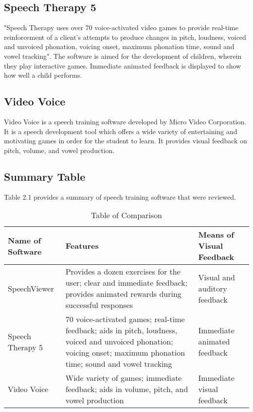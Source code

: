\subsection{Speech Therapy 5}
"Speech Therapy uses over 70 voice-activated video games to provide real-time reinforcement of a client's attempts to produce changes in pitch, loudness, voiced and unvoiced phonation, voicing onset, maximum phonation time, sound and vowel tracking"\cite{drspeech:1998:st5}. The software is aimed for the development of children, wherein they play interactive games. Immediate animated feedback is displayed to show how well a child performs.

\subsection{Video Voice}
Video Voice is a speech training software developed by Micro Video Corporation. It is a speech development tool which offers a wide variety of entertaining and motivating games in order for the student to learn. It provides visual feedback on pitch, volume, and vowel production.

\pagebreak
\subsection{Summary Table}
Table 2.1 provides a summary of speech training software that were reviewed.
\begin{table}[ht]   %
\centering
\caption{Table of Comparison} \vspace{0.25em}
\begin{tabular}{|p{1.5in}|p{2in}|p{2in}|}
 \hline
\centering
Name of Software & Features & Means of Visual Feedback \\ \hline
	SpeechViewer
		& Provides a dozen exercises for the user; clear and immediate feedback; provides animated rewards during successful responses 
		& Visual and auditory feedback
		\\ \hline
	Speech Therapy 5
		& 70 voice-activated games; real-time feedback; aids in pitch, loudness, voiced and unvoiced phonation; voicing onset; maximum phonation time; sound and vowel tracking
		& Immediate animated feedback
		\\ \hline
	Video Voice
		& Wide variety of games; immediate feedback; aids in volume, pitch, and vowel production
		& Immediate visual feedback
		\\ \hline
\end{tabular}
\label{tab:comparisontable2}
\end{table}